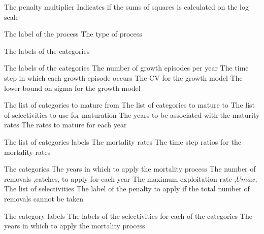  {The penalty multiplier}
 {Indicates if the sums of squares is calculated on the log scale}
\par\par
{} {The label of the process}
 {The type of process}
\par\textbf{}\par
{} {The labels of the categories}
\par\textbf{}\par
{} {The labels of the categories}
 {The number of growth episodes per year}
 {The time step in which each growth episode occurs}
 {The CV for the growth model}
 {The lower bound on sigma for the growth model}
\par\textbf{}\par
{} {The list of categories to mature from}
 {The list of categories to mature to}
 {The list of selectivities to use for maturation}
 {The years to be associated with the maturity rates}
 {The rates to mature for each year}
\par\textbf{}\par
{} {The list of categories labels}
 {The mortality rates}
 {The time step ratios for the mortality rates}
\par\textbf{}\par
{} {The categories}
 {The years in which to apply the mortality process}
 {The number of removals ,catches, to apply for each year}
 {The maximum exploitation rate ,$Umax$,}
 {The list of selectivities}
 {The label of the penalty to apply if the total number of removals cannot be taken}
\par\textbf{}\par
{} {The category labels}
 {The labels of the selectivities for each of the categories}
 {The years in which to apply the mortality process}
